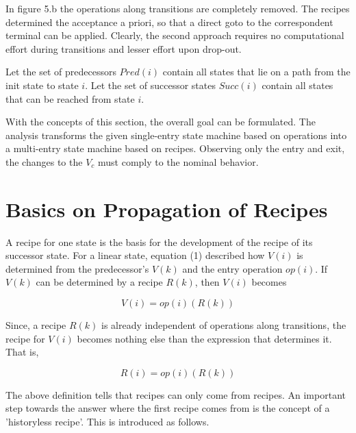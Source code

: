 \documentclass[12pt,a4paper]{scrartcl}
\begin{document}
In figure 5.b the operations along transitions are completely removed. The
recipes determined the acceptance a priori, so that a direct goto to the
correspondent terminal can be applied.  Clearly, the second approach requires
no computational effort during transitions and lesser effort upon drop-out.

Let the set of predecessors $Pred(i)$ contain all states that lie on a path
from the init state to state $i$. Let the set of successor states $Succ(i)$
contain all states that can be reached from state $i$.

With the concepts of this section, the overall goal can be formulated. The
analysis transforms the given single-entry state machine based on operations
into a multi-entry state machine based on recipes. Observing only the entry and
exit, the changes to the $V_c$ must comply to the nominal behavior. 

%
\section{Basics on Propagation of Recipes}

A recipe for one state is the basis for the development of the recipe of its
successor state. For a linear state, equation (1) described how $V(i)$ is
determined from the predecessor's $V(k)$ and the entry operation $op(i)$. If
$V(k)$ can be determined by a recipe $R(k)$, then $V(i)$ becomes

\begin{equation} \label{eq:accumulation2}
                     V(i) = op(i)(R(k))                                     
\end{equation}

Since, a recipe $R(k)$ is already independent of operations along transitions,
the recipe for $V(i)$ becomes nothing else than the expression that
determines it. That is,

\begin{equation} \label{eq:accumulation3}
                     R(i) = { op(i)(R(k)) }                                 
\end{equation}
                 
The above definition tells that recipes can only come from recipes. An
important step towards the answer where the first recipe comes from is the
concept of a 'historyless recipe'. This is introduced as follows. 
\end{document}
